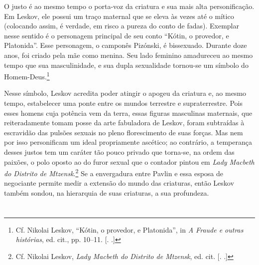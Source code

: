 O justo é ao mesmo tempo o porta-voz da criatura e sua mais alta
personificação. Em Leskov, ele possui um traço maternal que se eleva às
vezes até o mítico (colocando assim, é verdade, em risco a pureza do
conto de fadas). Exemplar nesse sentido é o personagem principal de seu
conto ``Kótin, o provedor, e Platonida''. Esse personagem, o camponês
Pizónski, é bissexuado. Durante doze anos, foi criado pela mãe como
menina. Seu lado feminino amadureceu ao mesmo tempo que sua
masculinidade, e sua dupla sexualidade tornou-se um símbolo do
Homem-Deus.\footnote{Cf. Nikolai Leskov, ``Kótin, o provedor, e
  Platonida'', in \emph{A Fraude e outras histórias}, ed. cit., pp.
  10--11. [. .]}

Nesse símbolo, Leskov acredita poder atingir o apogeu da criatura e, ao
mesmo tempo, estabelecer uma ponte entre os mundos terrestre e
supraterrestre. Pois esses homens cuja potência vem da terra, essas
figuras masculinas maternais, que reiteradamente tomam posse da arte
fabuladora de Leskov, foram subtraídas à escravidão das pulsões sexuais
no pleno florescimento de suas forças. Mas nem por isso personificam um
ideal propriamente ascético; ao contrário, a temperança desses justos
tem um caráter tão pouco privado que torna-se, na ordem das paixões, o
polo oposto ao do furor sexual que o contador pintou em \emph{Lady
Macbeth do Distrito de Mtzensk}.\footnote{Cf. Nikolai Leskov, \emph{Lady
  Macbeth do Distrito de Mtzensk}, ed. cit. [. .]} Se a
envergadura entre Pavlin e essa esposa de negociante permite medir a
extensão do mundo das criaturas, então Leskov também sondou, na
hierarquia de suas criaturas, a sua profundeza.

\section{}

